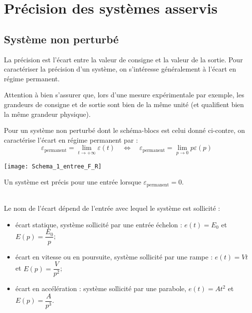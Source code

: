 \section{Précision des systèmes asservis}

\subsection{Système non perturbé}

\begin{defi}{}
La précision est l'écart entre la valeur de consigne et la valeur de la sortie. Pour caractériser la précision d'un système, on s'intéresse généralement à l'écart en régime permanent.

Attention à bien s'assurer que, lors d'une mesure expérimentale par exemple, les grandeurs de consigne et de sortie sont bien de la même unité (et qualifient bien la même grandeur physique).

\vspace{.2cm}

\noindent \begin{minipage}[c]{.6\linewidth}
Pour un système non perturbé dont le schéma-blocs est celui donné ci-contre, on caractérise l'écart en régime permanent par :
$$
\varepsilon_{\text{permanent}}=\lim\limits_{t\to +\infty} \varepsilon(t)
\quad
\Longleftrightarrow 
\quad
\varepsilon_{\text{permanent}}=\lim\limits_{p\to 0} p\varepsilon(p)
$$
\end{minipage}
\hspace{.5cm}
\begin{minipage}[c]{.25\linewidth}
%
\texttt{[image: Schema\_1\_entree\_F\_R]}
\end{minipage}

\end{defi}

\begin{defi}{}
Un système est précis pour une entrée lorsque $\varepsilon_{\text{permanent}}=0$.
\end{defi}

\begin{defi}{} \~\\
Le nom de l'écart dépend de l'entrée avec lequel le système est sollicité : 
\begin{itemize}
\item écart statique, système sollicité par une entrée échelon : $e(t)=E_0$ et $E(p)=\dfrac{E_0}{p}$;
\item écart en vitesse ou en poursuite, système sollicité par une rampe : $e(t)=Vt$ et $E(p)=\dfrac{V}{p^2}$;
\item écart en accélération : système sollicité par une parabole, $e(t)=At^2$ et $E(p)=\dfrac{A}{p^3}$.
\end{itemize}
\end{defi}

